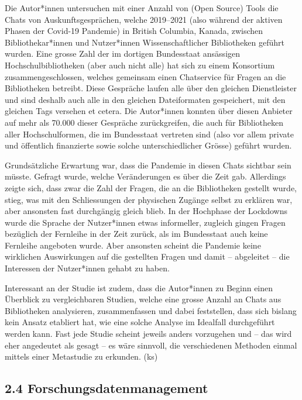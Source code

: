 \documentclass[a4paper,
fontsize=11pt,
oneside,
numbers=noperiodatend,
parskip=half-,
bibliography=totoc,
final
]{scrartcl}
\begin{document}
Die Autor*innen untersuchen mit einer Anzahl von (Open Source) Tools die
Chats von Auskunftsgesprächen, welche 2019--2021 (also während der
aktiven Phasen der Covid-19 Pandemie) in British Columbia, Kanada,
zwischen Bibliothekar*innen und Nutzer*innen Wissenschaftlicher
Bibliotheken geführt wurden. Eine grosse Zahl der im dortigen
Bundesstaat ansässigen Hochschulbibliotheken (aber auch nicht alle) hat
sich zu einem Konsortium zusammengeschlossen, welches gemeinsam einen
Chatservice für Fragen an die Bibliotheken betreibt. Diese Gespräche
laufen alle über den gleichen Dienstleister und sind deshalb auch alle
in den gleichen Dateiformaten gespeichert, mit den gleichen Tags
versehen et cetera. Die Autor*innen konnten über diesen Anbieter auf
mehr als 70.000 dieser Gespräche zurückgreifen, die auch für
Bibliotheken aller Hochschulformen, die im Bundesstaat vertreten sind
(also vor allem private und öffentlich finanzierte sowie solche
unterschiedlicher Grösse) geführt wurden.

Grundsätzliche Erwartung war, dass die Pandemie in diesen Chats sichtbar
sein müsste. Gefragt wurde, welche Veränderungen es über die Zeit gab.
Allerdings zeigte sich, dass zwar die Zahl der Fragen, die an die
Bibliotheken gestellt wurde, stieg, was mit den Schliessungen der
physischen Zugänge selbst zu erklären war, aber ansonsten fast
durchgängig gleich blieb. In der Hochphase der Lockdowns wurde die
Sprache der Nutzer*innen etwas informeller, zugleich gingen Fragen
bezüglich der Fernleihe in der Zeit zurück, als im Bundesstaat auch
keine Fernleihe angeboten wurde. Aber ansonsten scheint die Pandemie
keine wirklichen Auswirkungen auf die gestellten Fragen und damit --
abgeleitet -- die Interessen der Nutzer*innen gehabt zu haben.

Interessant an der Studie ist zudem, dass die Autor*innen zu Beginn
einen Überblick zu vergleichbaren Studien, welche eine grosse Anzahl an
Chats aus Bibliotheken analysieren, zusammenfassen und dabei
feststellen, dass sich bislang kein Ansatz etabliert hat, wie eine
solche Analyse im Idealfall durchgeführt werden kann. Fast jede Studie
scheint jeweils anders vorzugehen und -- das wird eher angedeutet als
gesagt -- es wäre sinnvoll, die verschiedenen Methoden einmal mittels
einer Metastudie zu erkunden. (ks)

\hypertarget{forschungsdatenmanagement}{%
\subsection{2.4
Forschungsdatenmanagement}\label{forschungsdatenmanagement}}
\end{document}

